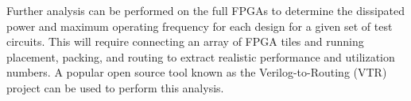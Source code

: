 \documentclass[twoside,twocolumn]{article}
\begin{document}
 Further analysis can be performed 
on the full FPGAs to determine the dissipated power and maximum 
operating frequency for each design for a given set of test circuits.
This will require connecting an array of FPGA tiles and running 
placement, packing, and routing to extract realistic performance and
utilization numbers. A popular open source tool known as the Verilog-to-Routing 
(VTR) project \cite{vtr8} can be used to perform this analysis.  



\printbibliography

\end{document}
